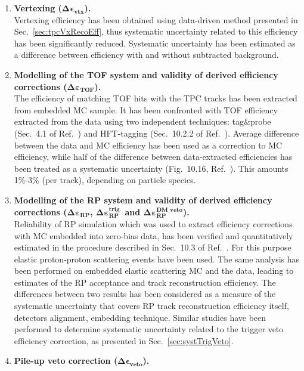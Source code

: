\begin{enumerate}
 \item \textbf{Vertexing ($\bm{\Delta\epsilon_{\text{vtx}}}$).}\\
 Vertexing efficiency has been obtained using data-driven method presented in Sec.~\ref{sec:tpcVxRecoEff}, thus systematic uncertainty related to this efficiency has been significantly reduced. Systematic uncertainty has been estimated as a difference between efficiency with and without subtracted background.
 \item \textbf{Modelling of the TOF system and validity of derived efficiency corrections ($\bm{\Delta\varepsilon_{\text{TOF}}}$).}\\
 The efficiency of matching TOF hits with the TPC tracks has been extracted from embedded MC sample. It has been confronted with TOF efficiency extracted from the data using two independent techniques: tag\&probe (Sec.~4.1 of Ref.~\cite{supplementaryNote}) and HFT-tagging (Sec.~10.2.2 of Ref.~\cite{supplementaryNote}). Average difference between the data and MC efficiency has been used as a correction to MC efficiency, while half of the difference between data-extracted efficiencies has been treated as a systematic uncertainty (Fig.~10.16, Ref.~\cite{supplementaryNote}). This amounts 1\%-3\% (per track), depending on particle species.
%
 \item \textbf{Modelling of the RP system and validity of derived efficiency corrections ($\bm{\Delta\varepsilon_{\text{RP}}}$, $\bm{\Delta\varepsilon_{\text{RP}}^{\text{trig.}}}$ and $\bm{\Delta\varepsilon_{\text{RP}}^{\text{DM veto}}}$).}\\
 Reliability of RP simulation which was used to extract efficiency corrections with MC embedded into zero-bias data, has been verified and quantitatively estimated in the procedure described in Sec.~10.3 of Ref.~\cite{supplementaryNote}. For this purpose elastic proton-proton scattering events have been used. The same analysis has been performed on embedded elastic scattering MC and the data, leading to estimates of the RP acceptance and track reconstruction efficiency. The differences between two results has been considered as a measure of the systematic uncertainty that covers RP track reconstruction efficiency itself, detectors alignment, embedding technique. Similar studies have been performed to determine systematic uncertainty related to the trigger veto efficiency correction, as presented in Sec.~\ref{sec:systTrigVeto}.
 \item \textbf{Pile-up veto correction ($\bm{\Delta\epsilon_{\text{veto}}}$).}\\

\end{enumerate}
